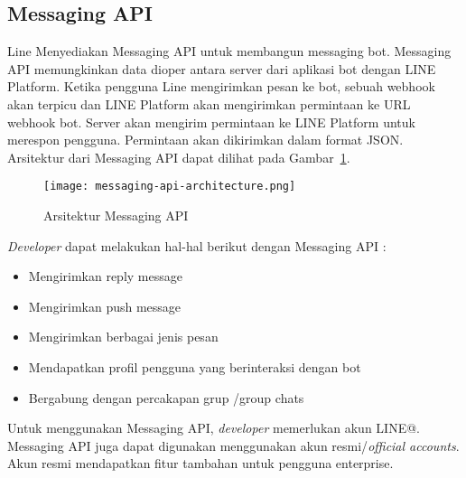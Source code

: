 \subsection{Messaging API } 
Line Menyediakan Messaging API untuk membangun messaging bot. Messaging API memungkinkan data dioper antara server dari aplikasi bot dengan LINE Platform. Ketika pengguna Line mengirimkan pesan ke bot, sebuah webhook akan terpicu dan LINE Platform akan mengirimkan permintaan ke URL webhook bot. Server akan mengirim permintaan ke LINE Platform untuk merespon pengguna. Permintaan akan dikirimkan dalam format JSON. Arsitektur dari Messaging API dapat dilihat pada Gambar~\ref{fig:messaging_api_architecture}.

\begin{figure}[H]
	\centering  
	\texttt{[image: messaging-api-architecture.png]}  
	\caption[Arsitektur Messaging API]{Arsitektur Messaging API} 
	\label{fig:messaging_api_architecture} 
\end{figure}

\textit{Developer} dapat melakukan hal-hal berikut dengan Messaging API :
\begin{itemize}
\item Mengirimkan reply message
\item Mengirimkan push message
\item Mengirimkan berbagai jenis pesan
\item Mendapatkan profil pengguna yang berinteraksi dengan bot
\item Bergabung dengan percakapan grup /group chats
\end{itemize}

Untuk menggunakan Messaging API, \textit{developer} memerlukan akun LINE@. Messaging API juga dapat digunakan menggunakan akun resmi/\textit{official accounts}. Akun resmi mendapatkan fitur tambahan untuk pengguna enterprise.

